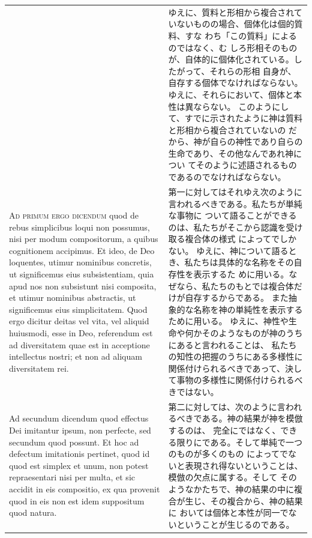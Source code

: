 \documentclass[paper=a4paper,fontsize=10pt,jafontsize=9pt,titlepage]{jlreq}
\begin{document}
\begin{longtable}{p{21em}p{21em}}
&

ゆえに、質料と形相から複合されていないものの場合、個体化は個的質料、すな
 わち「この質料」によるのではなく、む
 しろ形相そのものが、自体的に個体化されている。したがって、それらの形相
 自身が、自存する個体でなければならない。
ゆえに、それらにおいて、個体と本性は異ならない。
このようにして、すでに示されたように神は質料と形相から複合されていないの
 だから、神が自らの神性であり自らの生命であり、その他なんであれ神につい
 てそのように述語されるものであるのでなければならない。

\\






\textsc{Ad primum ergo dicendum} quod de rebus simplicibus loqui non
 possumus, nisi per modum compositorum, a quibus cognitionem accipimus.
Et ideo, de Deo loquentes, utimur nominibus concretis, ut significemus
 eius subsistentiam, quia apud nos non subsistunt nisi composita, et
 utimur nominibus abstractis, ut significemus eius simplicitatem.
Quod ergo dicitur deitas vel vita, vel aliquid huiusmodi, esse in Deo,
 referendum est ad diversitatem quae est in acceptione intellectus
 nostri; et non ad aliquam diversitatem rei.

&

第一に対してはそれゆえ次のように言われるべきである。私たちが単純な事物に
 ついて語ることができるのは、私たちがそこから認識を受け取る複合体の様式
 によってでしかない。
ゆえに、神について語るとき、私たちは具体的な名称をその自存性を表示するた
 めに用いる。なぜなら、私たちのもとでは複合体だけが自存するからである。
 また抽象的な名称を神の単純性を表示するために用いる。
ゆえに、神性や生命や何かそのようなものが神のうちにあると言われることは、
 私たちの知性の把握のうちにある多様性に関係付けられるべきであって、決し
 て事物の多様性に関係付けられるべきではない。

\\

Ad secundum dicendum quod effectus Dei imitantur ipsum, non perfecte,
 sed secundum quod possunt. Et hoc ad defectum imitationis pertinet,
 quod id quod est simplex et unum, non potest repraesentari nisi per
 multa, et sic accidit in eis compositio, ex qua provenit quod in eis
 non est idem suppositum quod natura.

&

第二に対しては、次のように言われるべきである。神の結果が神を模倣するのは、
 完全にではなく、できる限りにである。そして単純で一つのものが多くのもの
 によってでないと表現され得ないということは、模倣の欠点に属する。そして
 そのようなかたちで、神の結果の中に複合が生じ、その複合から、神の結果に
 おいては個体と本性が同一でないということが生じるのである。


\end{longtable}
\end{document}
